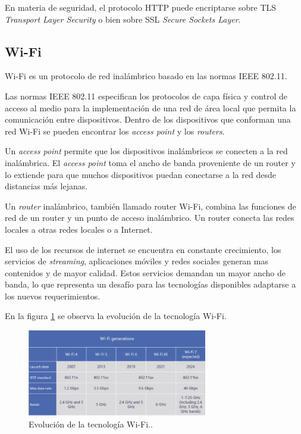 
En materia de seguridad, el protocolo HTTP
 puede encriptarse sobre TLS \textit{Transport Layer Security} o bien sobre SSL \textit{Secure Sockets Layer}.

\subsection{Wi-Fi}

Wi-Fi es un protocolo de red inalámbrico basado en las normas IEEE 802.11. 

Las normas IEEE 802.11 especifican los protocolos de capa física y control de acceso al medio para la implementación de una red de área local que permita la comunicación entre dispositivos. Dentro de los dispositivos que conforman una red Wi-Fi se pueden encontrar los \textit{access point} y los \textit{routers}. 

Un \textit{access point} permite que los dispositivos inalámbricos se conecten a la red inalámbrica. El \textit{access point} toma el ancho de banda proveniente de un router y lo extiende para que muchos dispositivos puedan conectarse a la red desde distancias más lejanas.

Un \textit{router} inalámbrico, también llamado router Wi-Fi, combina las funciones de red de un router y un punto de acceso inalámbrico. Un router conecta las redes locales a otras redes locales o a Internet\citep{wifii}.

El uso de los recursos de internet se encuentra en constante crecimiento, los servicios de \textit{streaming}, aplicaciones móviles y redes sociales generan mas contenidos y de mayor calidad. Estos servicios demandan un mayor ancho de banda, lo que representa un desafío para las tecnologías disponibles adaptarse a los nuevos requerimientos.

En la figura \ref{fig:WIFIEVO} se observa la evolución de la tecnología Wi-Fi.


\begin{figure}[htbp]
	\centering
	\includegraphics[width=0.7\textwidth]{./Figures/WIFIEVO.png}
	\caption{Evolución de la tecnología Wi-Fi.\protect\footnotemark.}
	\label{fig:WIFIEVO}
\end{figure} 

